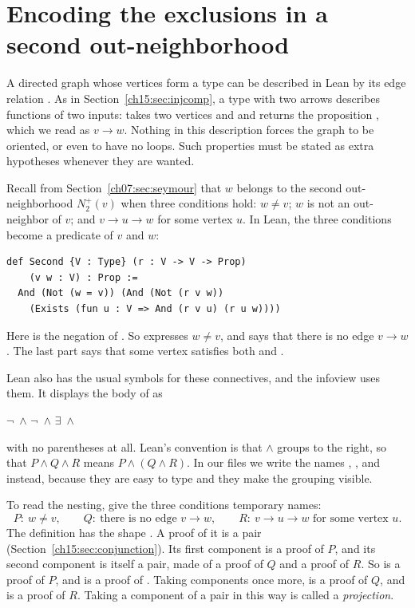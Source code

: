 \section{Encoding the exclusions in a second out-neighborhood}\label{ch16:sec:second}
A directed graph whose vertices form a type  can be described in Lean by its edge relation . As in Section~\ref{ch15:sec:injcomp}, a type with two arrows describes functions of two inputs:  takes two vertices  and  and returns the proposition , which we read as $v\to w$. Nothing in this description forces the graph to be oriented, or even to have no loops. Such properties must be stated as extra hypotheses whenever they are wanted.

Recall from Section~\ref{ch07:sec:seymour} that $w$ belongs to the second out-neighborhood $N_2^+(v)$ when three conditions hold: $w\ne v$; $w$ is not an out-neighbor of $v$; and $v\to u\to w$ for some vertex $u$. In Lean, the three conditions become a predicate of $v$ and $w$:
\par\noindent\begin{minipage}{\linewidth}
\begin{lstlisting}
def Second {V : Type} (r : V -> V -> Prop)
    (v w : V) : Prop :=
  And (Not (w = v)) (And (Not (r v w))
    (Exists (fun u : V => And (r v u) (r u w))))
\end{lstlisting}
\end{minipage}\par
Here  is the negation of . So  expresses $w\ne v$, and  says that there is no edge $v\to w$. The last part says that some vertex  satisfies both  and .

Lean also has the usual symbols for these connectives, and the infoview uses them. It displays the body of  as
\begin{center}
$\neg$\, $\land$ $\neg$\, $\land$ $\exists$\, $\land$ 
\end{center}
with no parentheses at all. Lean's convention is that $\land$ groups to the right, so that $P\land Q\land R$ means $P\land(Q\land R)$. In our files we write the names , , and  instead, because they are easy to type and they make the grouping visible.

To read the nesting, give the three conditions temporary names:
\[
 P:\ w\ne v,\qquad Q:\ \text{there is no edge }v\to w,\qquad
 R:\ v\to u\to w\text{ for some vertex }u.
\]
The definition has the shape . A proof  of it is a pair (Section~\ref{ch15:sec:conjunction}). Its first component is a proof of $P$, and its second component is itself a pair, made of a proof of $Q$ and a proof of $R$. So  is a proof of $P$, and  is a proof of . Taking components once more,  is a proof of $Q$, and  is a proof of $R$. Taking a component of a pair in this way is called a \emph{projection}.

